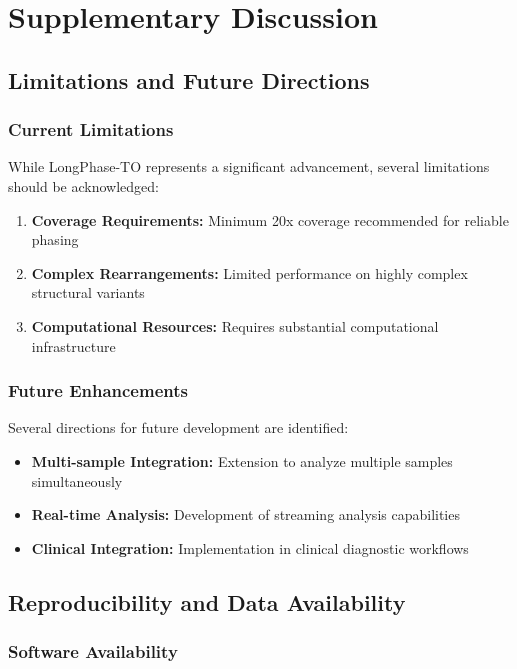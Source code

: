 \documentclass[pdflatex,sn-nature]{sn-jnl}
\begin{document}
\section{Supplementary Discussion}

\subsection{Limitations and Future Directions}

\subsubsection{Current Limitations}

While LongPhase-TO represents a significant advancement, several limitations should be acknowledged:

\begin{enumerate}
\item \textbf{Coverage Requirements:} Minimum 20x coverage recommended for reliable phasing
\item \textbf{Complex Rearrangements:} Limited performance on highly complex structural variants
\item \textbf{Computational Resources:} Requires substantial computational infrastructure
\end{enumerate}

\subsubsection{Future Enhancements}

Several directions for future development are identified:

\begin{itemize}
\item \textbf{Multi-sample Integration:} Extension to analyze multiple samples simultaneously
\item \textbf{Real-time Analysis:} Development of streaming analysis capabilities
\item \textbf{Clinical Integration:} Implementation in clinical diagnostic workflows
\end{itemize}

\subsection{Reproducibility and Data Availability}

\subsubsection{Software Availability}
\end{document}
